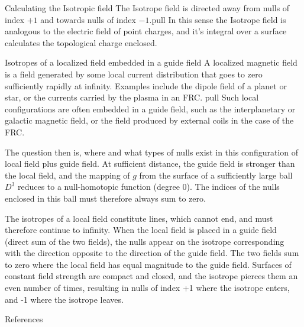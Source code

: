 \documentclass[final]{beamer}
\newlength{\onecolwid}
\begin{document}
\begin{frame}[t]
\begin{columns}[t]
\begin{column}{\onecolwid}
\begin{block}{Calculating the Isotropic field}
    The Isotrope field is directed away from nulls of index $+1$ and towards nulls of
    index $-1$.pull
    In this sense the Isotrope field is analogous to the electric field of  point charges, and it's
    integral over a surface calculates the topological charge enclosed.



\end{block}

\begin{block}{Isotropes of a localized field embedded in a guide field}
    A localized magnetic field is a field generated by some local current distribution
    that goes to zero sufficiently rapidly at infinity. 
    Examples include the dipole field of a planet or star, or the currents carried by the
    plasma in an FRC. pull
    Such local configurations are often embedded in a guide field, such as the
    interplanetary or galactic magnetic field, or the field produced by external coils in
    the case of the FRC. 

    The question then is, where and what types of nulls exist in this configuration of
    local field plus guide field. 
    At sufficient distance, the guide field is stronger than the local field, and the
    mapping of $g$ from the surface of a sufficiently large ball $D^3$ reduces to a null-homotopic
    function (degree 0).
    The indices of the nulls enclosed in this ball must therefore always sum to zero. 

    The isotropes of a local field
    constitute lines, which cannot end, and must therefore continue to infinity. 
    When the local field is placed in a guide field (direct sum of the two fields), the
    nulls appear on the isotrope corresponding with the direction opposite to the
    direction of the guide field. 
    The two fields sum to zero where the local field has equal magnitude to the guide
    field. 
    Surfaces of constant field strength are compact and closed, and the isotrope pierces
    them an even number of times, resulting in nulls of index +1 where the isotrope
    enters, and -1 where the isotrope leaves. 
    




\end{block}


\begin{block}{References}


\end{block}
\end{column}
\end{columns}
\end{frame}
\end{document}
